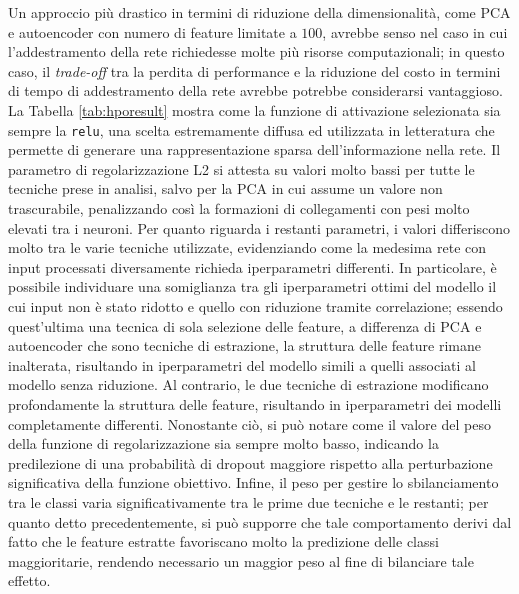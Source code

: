 Un approccio più drastico in termini di riduzione della dimensionalità, come PCA e autoencoder con numero di feature limitate a $100$, avrebbe senso nel caso in cui l'addestramento della rete richiedesse molte più risorse computazionali; in questo caso, il \textit{trade-off} tra la perdita di performance e la riduzione del costo in termini di tempo di addestramento della rete avrebbe potrebbe considerarsi vantaggioso.
La Tabella \ref{tab:hporesult} mostra come la funzione di attivazione selezionata sia sempre la \texttt{relu}, una scelta estremamente diffusa ed utilizzata in letteratura che permette di generare una rappresentazione sparsa dell'informazione nella rete. 
Il parametro di regolarizzazione L2 si attesta su valori molto bassi per tutte le tecniche prese in analisi, salvo per la PCA in cui assume un valore non trascurabile, penalizzando così la formazioni di collegamenti con pesi molto elevati tra i neuroni. 
Per quanto riguarda i restanti parametri, i valori differiscono molto tra le varie tecniche utilizzate, evidenziando come la medesima rete con input processati diversamente richieda iperparametri differenti. 
In particolare, è possibile individuare una somiglianza tra gli iperparametri ottimi del modello il cui input non è stato ridotto e quello con riduzione tramite correlazione; essendo quest'ultima una tecnica di sola selezione delle feature, a differenza di PCA e autoencoder che sono tecniche di estrazione, la struttura delle feature rimane inalterata, risultando in iperparametri del modello simili a quelli associati al modello senza riduzione. 
Al contrario, le due tecniche di estrazione modificano profondamente la struttura delle feature, risultando in iperparametri dei modelli completamente differenti.
Nonostante ciò, si può notare come il valore del peso della funzione di regolarizzazione sia sempre molto basso, indicando la predilezione di una probabilità di dropout maggiore rispetto alla perturbazione significativa della funzione obiettivo.
Infine, il peso per gestire lo sbilanciamento tra le classi varia significativamente tra le prime due tecniche e le restanti; per quanto detto precedentemente, si può supporre che tale comportamento derivi dal fatto che le feature estratte favoriscano molto la predizione delle classi maggioritarie, rendendo necessario un maggior peso al fine di bilanciare tale effetto.


